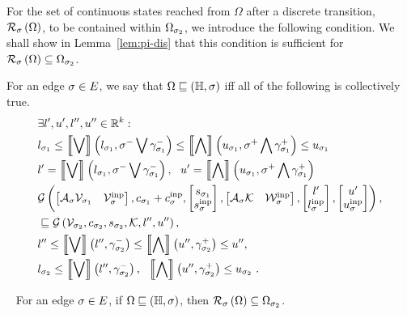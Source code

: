 For the set of continuous states reached from $\Omega$ after a
discrete transition, $\mathcal{R}_{\sigma}\left(\Omega\right)$, to be contained
within 
$\Omega_{\sigma_2}$, we introduce the following condition.  We shall
show in Lemma~\ref{lem:pi-dis} that this condition is sufficient for
$\mathcal{R}_{\sigma}\left(\Omega\right)\subseteq\Omega_{\sigma_2}$.
%
\begin{definition}
For an edge $\sigma\in E$, we say that $\Omega\sqsubseteq\left(\mathbb{H},\sigma\right)$
iff all of the following is collectively true.
%
\begin{align}
& \exists l^\prime,u^\prime,l^{\prime\prime},u^{\prime\prime}\in\mathbb{R}^k:\nonumber\\
& l_{\sigma_1}\leq \left\llbracket\bigvee\right\rrbracket\left(l_{\sigma_1},\sigma^-\bigvee \gamma_{\sigma_1}^-\right)\leq
\left\llbracket\bigwedge\right\rrbracket\left(u_{\sigma_1},\sigma^+\bigwedge \gamma_{\sigma_1}^+\right)\leq u_{\sigma_1}~\label{eqn:disinv1}\\
&
l^\prime=\left\llbracket\bigvee\right\rrbracket\left(l_{\sigma_1},\sigma^-\bigvee \gamma_{\sigma_1}^-\right),~~
u^\prime=\left\llbracket\bigwedge\right\rrbracket\left(u_{\sigma_1},\sigma^+\bigwedge \gamma_{\sigma_1}^+\right)~\label{eqn:disinv2}\\
& \mathcal{G}\left(
\left[\begin{matrix}\mathcal{A}_{\sigma}\mathcal{V}_{\sigma_1} & \mathcal{V}^{\operatorname{inp}}_{\sigma}\end{matrix}\right]
,
c_{\sigma_1}+c^{\operatorname{inp}}_{\sigma}
,
\left[\begin{matrix}s_{\sigma_1}\\ s^{\operatorname{inp}}_{\sigma}\end{matrix}\right]
,
\left[\begin{matrix}\mathcal{A}_{\sigma}\mathcal{K} & \mathcal{W}^{\operatorname{inp}}_{\sigma}\end{matrix}\right]
,
\left[\begin{matrix}l^\prime\\l^{\operatorname{inp}}_{\sigma}\end{matrix}\right]
,
\left[\begin{matrix}u^\prime\\ u^{\operatorname{inp}}_{\sigma}\end{matrix}\right]
\right),\nonumber\\
& \sqsubseteq 
\mathcal{G}\left(\mathcal{V}_{\sigma_2},c_{\sigma_2},s_{\sigma_2},\mathcal{K},l^{\prime\prime},u^{\prime\prime}\right),~\label{eqn:disinv3}\\
&
l^{\prime\prime}\leq\left\llbracket\bigvee\right\rrbracket\left(l^{\prime\prime},\gamma_{\sigma_2}^-\right)\leq\left\llbracket\bigwedge\right\rrbracket\left(u^{\prime\prime},\gamma_{\sigma_2}^+\right)\leq
u^{\prime\prime},~\label{eqn:disinv4}\\
& l_{\sigma_2}\leq\left\llbracket\bigvee\right\rrbracket\left(l^{\prime\prime},\gamma_{\sigma_2}^-\right),~~\left\llbracket\bigwedge\right\rrbracket\left(u^{\prime\prime},\gamma_{\sigma_2}^+\right)\leq u_{\sigma_2}~\label{eqn:disinv5}.
\end{align}
%
\end{definition}
%
\begin{lemma}~\label{lem:pi-dis}
For an edge $\sigma\in E$, if $\Omega\sqsubseteq\left(\mathbb{H},\sigma\right)$, then $\mathcal{R}_{\sigma}\left(\Omega\right)\subseteq\Omega_{\sigma_2}$.
\end{lemma}
%
